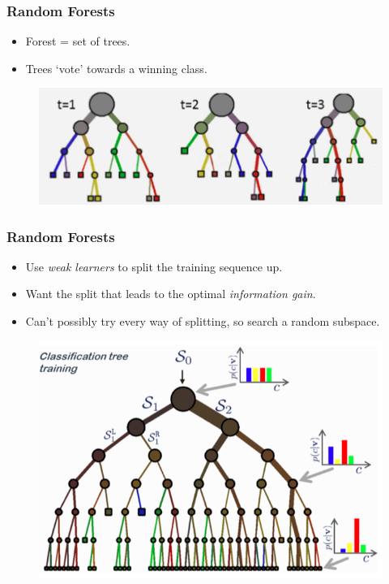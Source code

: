 \documentclass{beamer}
\begin{document}
\begin{frame}
    \frametitle{Random Forests}

    \begin{block}{}
        \begin{itemize}
            \item Forest = set of trees.
            \item Trees `vote' towards a winning class.
        \end{itemize}

        \begin{figure}[H]
            \centering
            \includegraphics[scale=0.25]{Forests.png}
            \caption{\cite{r1}}
        \end{figure}
    \end{block}
\end{frame}

\begin{frame}
    \frametitle{Random Forests}

    \begin{block}{}
        \begin{itemize}
            \item Use \textit{weak learners} to split the training sequence up.
            \item Want the split that leads to the optimal \textit{information gain}.
            \item Can't possibly try every way of splitting, so search a random subspace.
        \end{itemize}

        \begin{figure}[H]
            \centering
            \includegraphics[scale=0.25]{ProbabilityTree.png}
            \caption{\cite{r1}}
        \end{figure}
    \end{block}
\end{frame}
\end{document}
